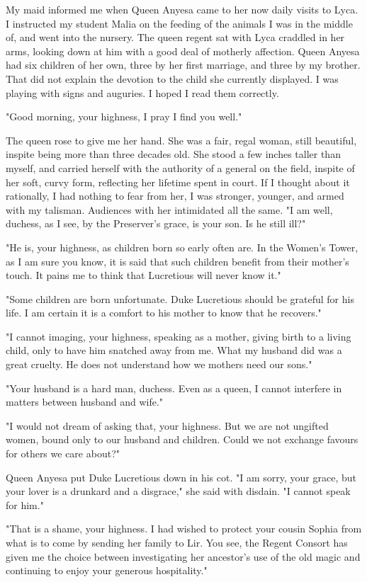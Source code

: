 \documentclass{article}
\begin{document}
My maid informed me when Queen Anyesa came to her now daily visits to Lyca. I instructed my student Malia on the feeding of the animals I was in the middle of, and went into the nursery. The queen regent sat with Lyca craddled in her arms, looking down at him with a good deal of motherly affection. Queen Anyesa had six children of her own, three by her first marriage, and three by my brother. That did not explain the devotion to the child she currently displayed. I was playing with signs and auguries. I hoped I read them correctly.

"Good morning, your highness, I pray I find you well."

The queen rose to give me her hand. She was a fair, regal woman, still beautiful, inspite being more than three decades old. She stood a few inches taller than myself, and carried herself with the authority of a general on the field, inspite of her soft, curvy form, reflecting her lifetime spent in court. If I thought about it rationally, I had nothing to fear from her, I was stronger, younger, and armed with my talisman. Audiences with her intimidated all the same. "I am well, duchess, as I see, by the Preserver's grace, is your son. Is he still ill?"

"He is, your highness, as children born so early often are. In the Women's Tower, as I am sure you know, it is said that such children benefit from their mother's touch. It pains me to think that Lucretious will never know it."

"Some children are born unfortunate. Duke Lucretious should be grateful for his life. I am certain it is a comfort to his mother to know that he recovers."
 
"I cannot imaging, your highness, speaking as a mother, giving birth to a living child, only to have him snatched away from me. What my husband did was a great cruelty. He does not understand how we mothers need our sons."

"Your husband is a hard man, duchess. Even as a queen, I cannot interfere in matters between husband and wife."

"I would not dream of asking that, your highness. But we are not ungifted women, bound only to our husband and children. Could we not exchange favours for others we care about?"

Queen Anyesa put Duke Lucretious down in his cot. "I am sorry, your grace, but your lover is a drunkard and a disgrace," she said with disdain. "I cannot speak for him."

"That is a shame, your highness. I had wished to protect your cousin Sophia from what is to come by sending her family to Lir. You see, the Regent Consort has given me the choice between investigating her ancestor's use of the old magic and continuing to enjoy your generous hospitality."
\end{document}
